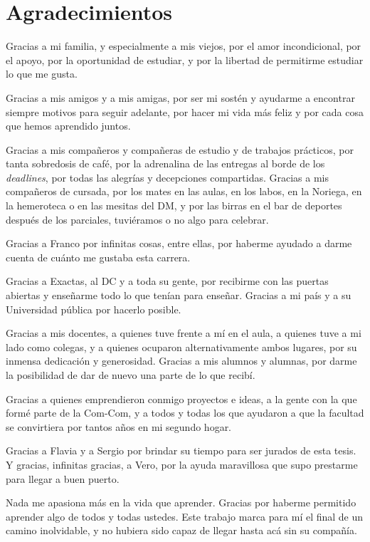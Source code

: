\chapter*{Agradecimientos}

Gracias a mi familia, y especialmente a mis viejos, por el amor incondicional,
por el apoyo, por la oportunidad de estudiar, y por la libertad de permitirme
estudiar lo que me gusta.

Gracias a mis amigos y a mis amigas, por ser mi sostén y ayudarme a encontrar
siempre motivos para seguir adelante,
por hacer mi vida más feliz y por cada cosa que hemos aprendido juntos.

Gracias a mis compañeros y compañeras de estudio y de trabajos prácticos, por
tanta sobredosis de café, por la adrenalina de las entregas al borde de los
\emph{deadlines}, por todas las alegrías y decepciones compartidas.
Gracias a mis compañeros de cursada, por los mates en las aulas, en los labos,
en la Noriega, en la hemeroteca o en las mesitas del DM, y por las birras en el
bar de deportes después de los parciales, tuviéramos o no algo para celebrar.

Gracias a Franco por infinitas cosas, entre ellas, por haberme ayudado a darme
cuenta de cuánto me gustaba esta carrera.

Gracias a Exactas, al DC y a toda su gente, por recibirme con las puertas
abiertas y enseñarme todo lo que tenían para enseñar. Gracias a mi país y a su
Universidad pública por hacerlo posible.

Gracias a mis docentes, a quienes tuve frente a mí en el aula, a quienes tuve a
mi lado como colegas, y a quienes ocuparon alternativamente ambos lugares,
por su inmensa dedicación y
generosidad.
Gracias a mis alumnos y alumnas, por darme la posibilidad de dar de nuevo una
parte de lo que recibí.

Gracias a quienes emprendieron conmigo proyectos e ideas, a la gente con la que
formé parte de la Com-Com, y a todos y todas los que ayudaron a que la facultad
se convirtiera por tantos años en mi segundo hogar.

Gracias a Flavia y a Sergio por brindar su tiempo para ser jurados de esta
tesis.
Y gracias, infinitas gracias, a Vero, por la ayuda maravillosa que supo
prestarme para llegar a buen puerto.

\medskip

Nada me apasiona más en la vida que aprender.
Gracias por haberme permitido aprender algo de todos y todas ustedes.
Este trabajo marca para mí el final de un camino inolvidable, y no hubiera sido
capaz de llegar hasta acá sin su compañía.

